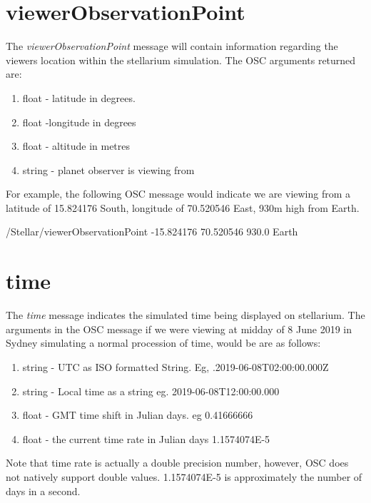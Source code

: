 \section{viewerObservationPoint}
The \textit{viewerObservationPoint} message will contain information regarding the viewers location within the stellarium simulation. The OSC arguments returned are:
\begin{enumerate}
	\item float - latitude in degrees. 
	\item float -longitude in degrees
	\item float - altitude in metres
	\item string - planet  observer is viewing from
\end{enumerate}

For example, the following OSC message would indicate we are viewing from a latitude of 15.824176 South, longitude of 70.520546 East, 930m high from Earth.

\begin{syntax}
	/Stellar/viewerObservationPoint -15.824176 70.520546 930.0 Earth
\end{syntax}

\section{time}
The \textit{time} message indicates the simulated time being displayed on stellarium. The arguments in the OSC message if we were viewing at midday of 8 June 2019 in Sydney simulating a normal procession of time, would be are as follows:
\begin{enumerate}
	\item string - UTC as ISO formatted String. Eg, .2019-06-08T02:00:00.000Z
	\item string - Local time as a string eg. 2019-06-08T12:00:00.000
	\item float - GMT time shift in Julian days. eg 0.41666666
	\item float - the current time rate in Julian days 1.1574074E-5
\end{enumerate}

Note that time rate is actually a double precision number, however, OSC does not natively support double values. 1.1574074E-5 is approximately the number of days in a second.
